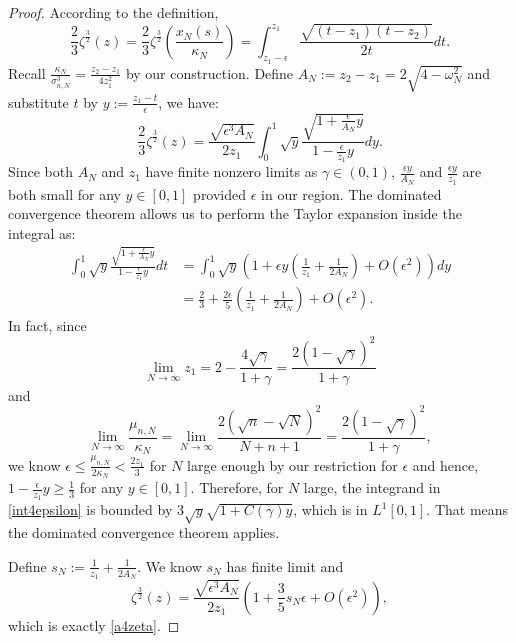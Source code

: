 \documentclass[10pt,a4paper]{amsart}
\begin{document}
\begin{proof}
   According to the definition, 
\begin{equation*}
        \frac{2}{3}\zeta^{\frac{3}{2}}(z)=\frac{2}{3}\zeta^{\frac{3}{2}}\left(\frac{x_N(s)}{\kappa_N}\right)=\int_{z_1-\epsilon}^{z_1}\frac{\sqrt{(t-z_1)(t-z_2)}}{2t}dt.
\end{equation*}
Recall $\frac{\kappa_N}{\sigma_{n,N}^3}=\frac{z_2-z_1}{4z_1^2}$ by our construction. Define $A_N:=z_2-z_1=2\sqrt{4-\omega_N^2}$ and substitute $t$ by $y:=\frac{z_1-t}{\epsilon}$, we have:
\begin{equation*}
          \frac{2}{3}\zeta^{\frac{3}{2}}(z)=\frac{\sqrt{\epsilon^3A_N}}{2z_1}\int_0^1\sqrt y\frac{\sqrt{1+\frac{\epsilon}{A_N}y}}{1-\frac{\epsilon}{z_1}y}dy.
\end{equation*}
Since both $A_N$ and $z_1$ have finite nonzero limits as $\gamma\in(0,1)$, $\frac{\epsilon y}{A_N}$ and $\frac{\epsilon y}{z_1}$ are both small for any $y\in[0,1]$ provided $\epsilon$ in our region. The dominated convergence theorem allows us to perform the Taylor expansion inside the integral as:
\begin{equation}\label{int4epsilon}
\begin{split}
    \int_0^1\sqrt y\frac{\sqrt{1+\frac{\epsilon}{A_N}y}}{1-\frac{\epsilon}{z_1}y}dt&=\int_0^1\sqrt{y}\left(1+\epsilon y(\frac{1}{z_1}+\frac{1}{2A_N})+O(\epsilon^2)\right)dy\\
    &=\frac{2}{3}+\frac{2\epsilon}{5}\left(\frac{1}{z_1}+\frac{1}{2A_N}\right)+O(\epsilon^2).
\end{split}
\end{equation}
In fact, since
\begin{equation*}
    \lim_{N\rightarrow\infty}z_1=2-\frac{4\sqrt\gamma}{1+\gamma}=\frac{2(1-\sqrt\gamma)^2}{1+\gamma}
\end{equation*}
and
\begin{equation*}
    \lim_{N\rightarrow\infty}\frac{\mu_{n,N}}{\kappa_N}=\lim_{N\rightarrow\infty}\frac{2(\sqrt n-\sqrt N)^2}{N+n+1}=\frac{2(1-\sqrt\gamma)^2}{1+\gamma},
\end{equation*}
 we know $\epsilon\le\frac{\mu_{n,N}}{2\kappa_N}<\frac{2z_1}{3}$ for $N$ large enough by our restriction for $\epsilon$ and hence, $1-\frac{\epsilon}{z_1}y\ge \frac{1}{3}$ for any $y\in[0,1]$. Therefore, for $N$ large, the integrand in \eqref{int4epsilon} is bounded by $3\sqrt y\sqrt{1+C(\gamma)y}$, which is in $L^1[0,1]$. That means the dominated convergence theorem applies.

Define $s_N:=\frac{1}{z_1}+\frac{1}{2A_N}$. We know $s_N$ has finite limit and
\begin{equation*}
    \zeta^{\frac{3}{2}}(z)=\frac{\sqrt{\epsilon^3A_N}}{2z_1}\left(1+\frac{3}{5}s_N\epsilon+O(\epsilon^2)\right),
\end{equation*}
which is exactly \eqref{a4zeta}.


\end{proof}
\end{document}
